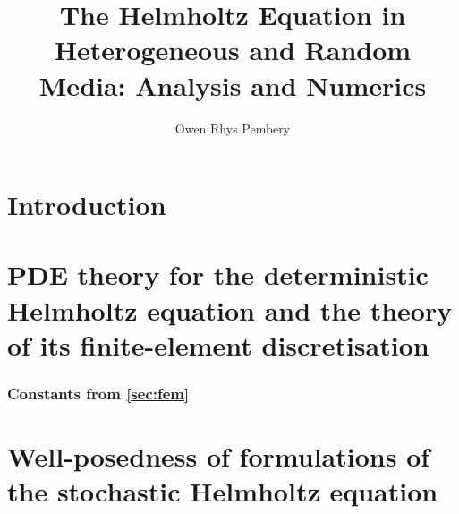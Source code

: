 \documentclass[11pt]{book}
\title{The Helmholtz Equation in Heterogeneous and Random Media: Analysis and Numerics}
\author{Owen Rhys Pembery}
\begin{document}


\maketitle

\makeaftertitle




\tableofcontents

\listoffigures
\listoftables
\listofalgorithms

\chapter{Introduction}\label{chap:intro}


\chapter{PDE theory for the deterministic Helmholtz equation and the theory of its finite-element discretisation}\label{chap:background}





\subsection{Constants from \cref{sec:fem}}\label{app:constants}


%

%

\chapter{Well-posedness of formulations of the sto\-chas\-tic Helmholtz equation}\label{chap:stochastic}

 








\end{document}
